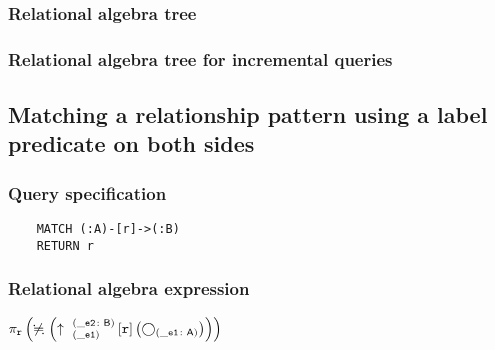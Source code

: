 	\subsubsection*{Relational algebra tree}


	\subsubsection*{Relational algebra tree for incremental queries}

	\subsection{Matching a relationship pattern using a label predicate on both sides}

	\subsubsection*{Query specification}

	\begin{lstlisting}
	MATCH (:A)-[r]->(:B)
	RETURN r
	\end{lstlisting}


	\subsubsection*{Relational algebra expression}

	$\projection{\var{r}} \left(\alldifferent{} \left(\expandout{\_e1}{\_e2}{B}{r}{} \left(\getvertices{\_e1}{A}\right)\right)\right)$


